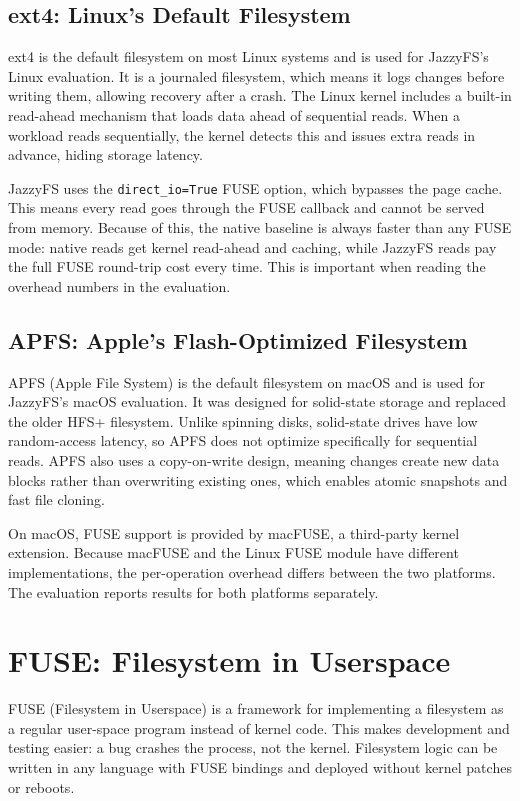 \documentclass[12pt]{report}
\begin{document}
\subsection{ext4: Linux's Default Filesystem}

ext4 is the default filesystem on most Linux systems and is used for
JazzyFS's Linux evaluation. It is a journaled filesystem, which means it
logs changes before writing them, allowing recovery after a crash. The
Linux kernel includes a built-in read-ahead mechanism that loads data ahead
of sequential reads. When a workload reads sequentially, the kernel detects
this and issues extra reads in advance, hiding storage latency.

JazzyFS uses the \texttt{direct\_io=True} FUSE option, which bypasses the
page cache. This means every read goes through the FUSE callback and cannot
be served from memory. Because of this, the native baseline is always faster
than any FUSE mode: native reads get kernel read-ahead and caching, while
JazzyFS reads pay the full FUSE round-trip cost every time. This is important when reading the overhead numbers in the evaluation.

\subsection{APFS: Apple's Flash-Optimized Filesystem}

APFS (Apple File System) is the default filesystem on macOS and is used for
JazzyFS's macOS evaluation. It was designed for solid-state storage and
replaced the older HFS+ filesystem. Unlike spinning disks, solid-state drives
have low random-access latency, so APFS does not optimize specifically for
sequential reads. APFS also uses a copy-on-write design, meaning changes
create new data blocks rather than overwriting existing ones, which enables
atomic snapshots and fast file cloning.

On macOS, FUSE support is provided by macFUSE, a third-party kernel
extension. Because macFUSE and the Linux FUSE module have different
implementations, the per-operation overhead differs between the two
platforms. The evaluation reports results for both platforms separately.

\section{FUSE: Filesystem in Userspace}
\label{sec:bg-fuse}

FUSE (Filesystem in Userspace) is a framework for implementing a filesystem
as a regular user-space program instead of kernel code. This makes
development and testing easier: a bug crashes the process, not the kernel.
Filesystem logic can be written in any language with FUSE bindings and
deployed without kernel patches or reboots.
\end{document}
